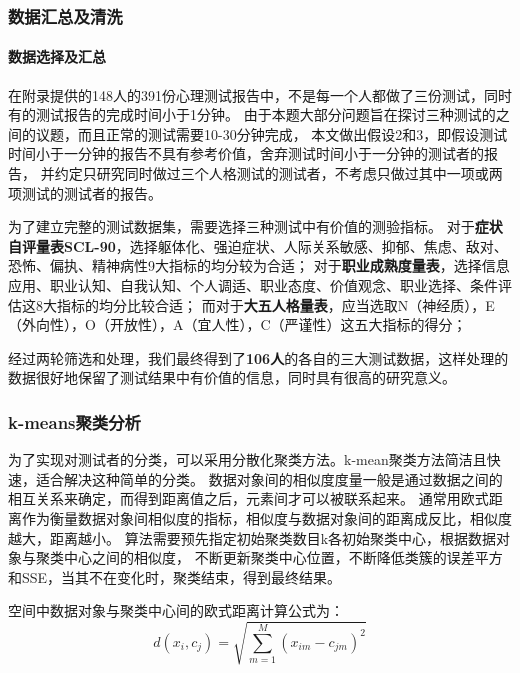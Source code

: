 \documentclass[withoutpreface,bwprint]{cumcmthesis} %
\begin{document}
\subsubsection{数据汇总及清洗}
\paragraph*{数据选择及汇总}
在附录提供的148人的391份心理测试报告中，不是每一个人都做了三份测试，同时有的测试报告的完成时间小于1分钟。
由于本题大部分问题旨在探讨三种测试的之间的议题，而且正常的测试需要10-30分钟完成\cite{SCL-90}\cite{The Career Development Quarterly}\cite{The Big Five trait taxonomy}，
本文做出假设2和3，即假设测试时间小于一分钟的报告不具有参考价值，舍弃测试时间小于一分钟的测试者的报告，
并约定只研究同时做过三个人格测试的测试者，不考虑只做过其中一项或两项测试的测试者的报告。

为了建立完整的测试数据集，需要选择三种测试中有价值的测验指标。
对于\textbf{症状自评量表SCL-90}，选择躯体化、强迫症状、人际关系敏感、抑郁、焦虑、敌对、恐怖、偏执、精神病性9大指标的均分较为合适；
对于\textbf{职业成熟度量表}，选择信息应用、职业认知、自我认知、个人调适、职业态度、价值观念、职业选择、条件评估这8大指标的均分比较合适；
而对于\textbf{大五人格量表}，应当选取N（神经质），E（外向性），O（开放性），A（宜人性），C（严谨性）这五大指标的得分；

经过两轮筛选和处理，我们最终得到了\textbf{106人}的各自的三大测试数据，这样处理的数据很好地保留了测试结果中有价值的信息，同时具有很高的研究意义。


\subsubsection{k-means聚类分析}

为了实现对测试者的分类，可以采用分散化聚类方法。k-mean聚类方法简洁且快速，适合解决这种简单的分类。
数据对象间的相似度度量一般是通过数据之间的相互关系来确定，而得到距离值之后，元素间才可以被联系起来。
通常用欧式距离作为衡量数据对象间相似度的指标，相似度与数据对象间的距离成反比，相似度越大，距离越小。
算法需要预先指定初始聚类数目k各初始聚类中心，根据数据对象与聚类中心之间的相似度，
不断更新聚类中心位置，不断降低类簇的误差平方和SSE，当其不在变化时，聚类结束，得到最终结果。


空间中数据对象与聚类中心间的欧式距离计算公式为：
\begin{equation}
    d(x_i, c_j) = \sqrt{\sum_{m=1}^M (x_{im} - c_{jm})^2}
    \label{eq:distance}
\end{equation}
\end{document}
